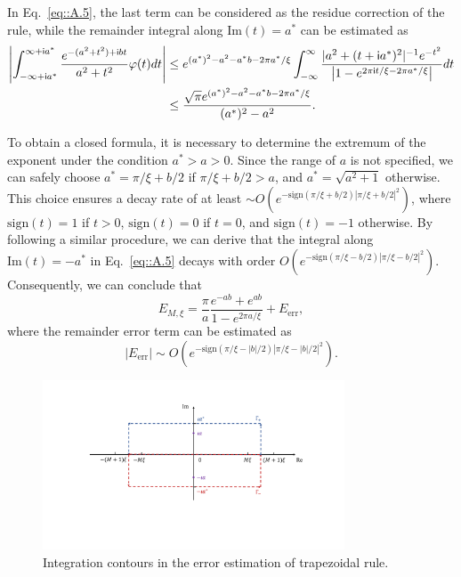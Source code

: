 In Eq.~\eqref{eq::A.5}, the last term can be considered as the residue correction of the rule, while the remainder integral along $\text{Im}(t)=a^*$ can be estimated as
\begin{equation}
\begin{split}
\left|\int_{-\infty+\mathsf i a^*}^{\infty+\mathsf i a^*}\frac{e^{-(a^2+t^2)+\mathsf i b t}}{a^2+t^2}\varphi(t)dt\right|&\leq e^{(a^*)^2-a^2-a^*b-2\pi a^*/\xi}\int_{-\infty}^{\infty}\frac{|a^2+(t+\mathsf i a^*)^2|^{-1}e^{-t^2}}{\left|1-e^{2\pi\mathsf i t/\xi-2\pi a^*/\xi}\right|}dt\\
&\leq\frac{\sqrt{\pi}e^{(a^*)^2-a^2-a^*b-2\pi a^*/\xi}}{(a^*)^2-a^2}.
\end{split}
\end{equation}

To obtain a closed formula, it is necessary to determine the extremum of the exponent under the condition $a^*>a>0$. Since the range of $a$ is not specified, we can safely choose $a^*=\pi/\xi+b/2$ if $\pi/\xi+b/2>a$, and $a^*=\sqrt{a^2+1}$ otherwise. This choice ensures a decay rate of at least $\sim O(e^{-\text{sign}(\pi/\xi+b/2)|\pi/\xi+b/2|^2})$, where $\text{sign}(t)=1$ if $t> 0$, $\text{sign}(t)=0$ if $t=0$, and $\text{sign}(t)=-1$ otherwise. By following a similar procedure, we can derive that the integral along $\text{Im}(t)=-a^*$ in Eq.~\eqref{eq::A.5} decays with order $O(e^{-\text{sign}(\pi/\xi-b/2)|\pi/\xi-b/2|^2})$. Consequently, we can conclude that
\begin{equation}
E_{M,\xi}=\frac{\pi}{a}\frac{e^{-ab}+e^{ab}}{1-e^{2\pi a/\xi}}+E_{\text{err}},
\end{equation}
where the remainder error term can be estimated as 
\begin{equation}\label{eq::A.8}
|E_{\text{err}}|\sim O(e^{-\text{sign}(\pi/\xi-|b|/2)\left|\pi/\xi-|b|/2\right|^2}).
\end{equation}

\begin{figure}[!ht]
    \begin{center}
    \includegraphics[width=0.8\textwidth]{figs/Trapezoidal.pdf}
    \caption{Integration contours in the error estimation of trapezoidal rule.}
    \label{fig:Trapezoidal}
    \end{center} 
\end{figure}

